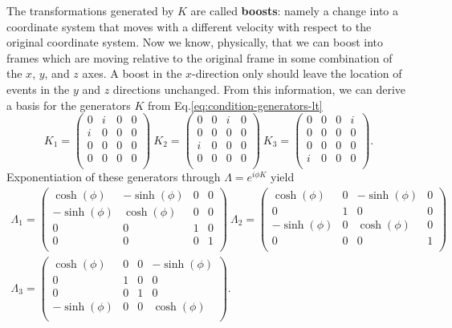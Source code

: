 \documentclass[11pt]{article}
\numberwithin{equation}{section}
\begin{document}
The transformations generated by $K$ are called \textbf{boosts}: namely a change into a coordinate system that moves with a different velocity with respect to the original coordinate system. Now we know, physically, that we can boost into frames which are moving relative to the original frame in some combination of the $x$, $y$, and $z$ axes. A boost in the $x$-direction only should leave the location of events in the $y$ and $z$ directions unchanged. From this information, we can derive a basis for the generators $K$ from Eq.\eqref{eq:condition-generators-lt}
\begin{equation}
K_1 = \begin{pmatrix}
0 & i & 0 & 0 \\
i & 0 & 0 & 0 \\
0 & 0 & 0 & 0 \\
0 & 0 & 0 & 0 \\
\end{pmatrix}\ 
K_2 = \begin{pmatrix}
0 & 0 & i & 0 \\
0 & 0 & 0 & 0 \\
i & 0 & 0 & 0 \\
0 & 0 & 0 & 0 \\
\end{pmatrix}\
K_3 = \begin{pmatrix}
0 & 0 & 0 & i \\
0 & 0 & 0 & 0 \\
0 & 0 & 0 & 0 \\
i & 0 & 0 & 0 \\
\end{pmatrix}. \label{eq:representation-boost-lorentz}
\end{equation}
Exponentiation of these generators through $\Lambda = e^{i \phi K}$ yield
\begin{align}
\Lambda_1 = \begin{pmatrix}
\cosh(\phi) & -\sinh(\phi) & 0 & 0 \\
-\sinh(\phi) & \cosh(\phi) & 0 & 0 \\
0 & 0 & 1 & 0 \\
0 & 0 & 0 & 1 \\
\end{pmatrix}\ 
\Lambda_2 = \begin{pmatrix}
\cosh(\phi) & 0 &  -\sinh(\phi) & 0 \\
0 & 1 & 0 & 0 \\
 -\sinh(\phi) & 0 & \cosh(\phi) & 0 \\
0 & 0 & 0 & 1 \\
\end{pmatrix}\nonumber \\
\Lambda_3 = \begin{pmatrix}
\cosh(\phi) & 0 & 0 & -\sinh(\phi) \\
0 & 1 & 0 & 0 \\
0 & 0 & 1 & 0 \\
-\sinh(\phi) & 0 & 0 & \cosh(\phi) \\
\end{pmatrix}.
\end{align}
\end{document}
